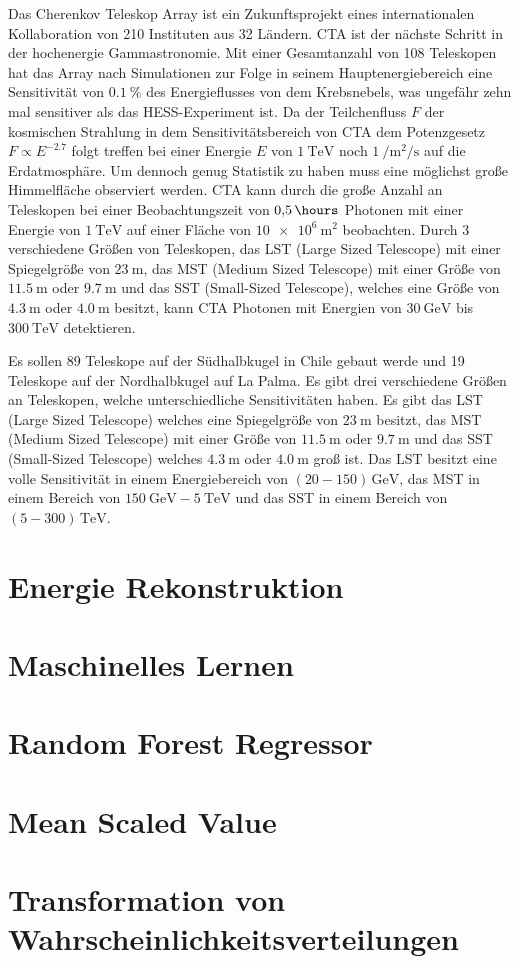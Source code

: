 Das Cherenkov Teleskop Array ist ein Zukunftsprojekt eines internationalen Kollaboration von 210 Instituten aus 32 Ländern\cite{CTA_consortium}.
CTA ist der nächste Schritt in der hochenergie Gammastronomie. Mit einer Gesamtanzahl von 108 Teleskopen hat das Array nach Simulationen
zur Folge in seinem Hauptenergiebereich eine Sensitivität von $\SI{0.1}{\percent}$ des Energieflusses von dem Krebsnebels,
was ungefähr zehn mal sensitiver als das HESS-Experiment ist\cite{CTA_paper}.
Da der Teilchenfluss $F$ der kosmischen Strahlung in dem Sensitivitätsbereich von CTA dem Potenzgesetz $F \propto E^{-2.7}$\cite[5]{Cosmic_ray} folgt
treffen bei einer Energie $E$ von $\SI{1}{\tera\eV}$ noch $\SI{1}{\per\m\squared\per\s}$ auf die Erdatmosphäre. Um dennoch genug Statistik
zu haben muss eine möglichst große Himmelfläche observiert werden. CTA kann durch die große Anzahl an Teleskopen bei einer Beobachtungszeit
von $\SI{0.5}{\hours}$ Photonen mit einer Energie von $\SI{1}{\tera\eV}$ auf einer Fläche von $\SI{10e6}{\m\squared}$\cite{CTA_ob} beobachten.
Durch 3 verschiedene Größen von Teleskopen, das LST (Large Sized Telescope) mit einer Spiegelgröße von $\SI{23}{\m}$, das MST (Medium Sized Telescope)
mit einer Größe von $\SI{11.5}{\m}$ oder $\SI{9.7}{\m}$ und das SST (Small-Sized Telescope), welches eine Größe von $\SI{4.3}{\m}$ oder $\SI{4.0}{\m}$
besitzt, kann CTA Photonen mit Energien von $\SI{30}{\giga\eV}$ bis $\SI{300}{\tera\eV}$ detektieren.


Es sollen 89 Teleskope auf der Südhalbkugel in Chile gebaut werde und 19 Teleskope auf der Nordhalbkugel auf La Palma.
Es gibt drei verschiedene Größen an Teleskopen, welche unterschiedliche Sensitivitäten haben. Es gibt das LST (Large Sized Telescope)
welches eine Spiegelgröße von $\SI{23}{\m}$ besitzt, das MST (Medium Sized Telescope) mit einer Größe von $\SI{11.5}{\m}$ oder $\SI{9.7}{\m}$
und das SST (Small-Sized Telescope) welches $\SI{4.3}{\m}$ oder $\SI{4.0}{\m}$ groß ist.
Das LST besitzt eine volle Sensitivität in einem Energiebereich von $(20-150)\,\si{\giga\eV}$, das MST in einem Bereich von
$\SI{150}{\giga\eV}-\SI{5}{\tera\eV}$ und das SST in einem Bereich von $(5-300)\,\si{\tera\eV}$.

\section{Energie Rekonstruktion}

\section{Maschinelles Lernen}

\section{Random Forest Regressor}

\section{Mean Scaled Value}


\section{Transformation von Wahrscheinlichkeitsverteilungen}
